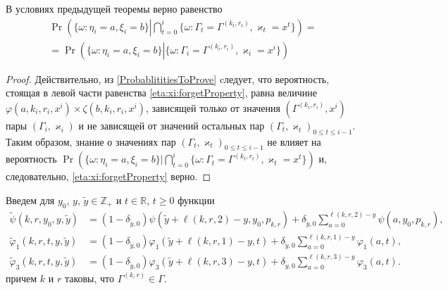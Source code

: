 \documentclass[a4paper,12pt,russian]{extarticle}
\newcommand{\ml}[1]{\begin{multline}#1\end{multline}}
\begin{document}
\begin{corollary}
В условиях предыдущей теоремы верно равенство
\ml
{
\Pr \left(\{ \omega \colon \eta_i = a, \xi_i=b\} \left|\bigcap_{t=0}^{i}\{\omega\colon \Gamma_t=\Gamma^{(k_t,r_t)}, \varkappa_t=x^t\}\right.\right)=\\
=\Pr \left(\{ \omega \colon \eta_i = a, \xi_i=b\} \left|\{\omega\colon \Gamma_i=\Gamma^{(k_i,r_i)}, \varkappa_i=x^i\}\right.\right)
\label{eta:xi:forgetProperty}
}
\label{eta:xi:forget}
\end{corollary}
\begin{proof}
Действительно, из \eqref{ProbablititiesToProve} cледует, что вероятность, стоящая в левой части равенства \eqref{eta:xi:forgetProperty}, равна величине $\varphi(a,k_i,r_i,x^i)\times \zeta(b,k_i,r_i,x^i)$, зависящей только от значения $(\Gamma^{(k_i,r_i)},x^i)$ пары $(\Gamma_i,\varkappa_i)$ и не зависящей от значений остальных пар $(\Gamma_t,\varkappa_t)_{0\leqslant t \leqslant i-1}$. Таким образом, знание о значениях пар $(\Gamma_t,\varkappa_t)_{0\leqslant t \leqslant i-1}$ не влияет на вероятность $\Pr (\{ \omega \colon \eta_i = a, \xi_i=b\} |\bigcap_{t=0}^{i}\{\omega\colon \Gamma_t=\Gamma^{(k_t,r_t)}, \varkappa_t=x^t\})$ и, следовательно, \eqref{eta:xi:forgetProperty} верно.
\end{proof}

Введем для $y_0$, $y$, $\tilde{y} \in \mathbb{Z}_+$ и $t \in \mathbb{R}$, $t\geqslant 0$ функции
\begin{equation}
\begin{aligned}
\widetilde{\psi}(k,r,y_0,y,\tilde{y}) &= 
(1 - \delta_{\tilde{y},0}) \psi(\tilde{y}+\ell(k,r,2)-y,y_0, p_{k,r}) + \delta_{\tilde{y},0}\sum_{a=0}^{\ell(k,r,2)-y} \psi(a,y_0, p_{k,r}),\\
\widetilde{\varphi}_1(k,r,t,y,\tilde{y}) &= (1-\delta_{\tilde{y},0}) \varphi_1(\tilde{y} + \ell(k,r,1)-y,t)  +\delta_{\tilde{y},0}\sum_{a=0}^{\ell(k,r,1)-y} \varphi_1(a,t),\\
\widetilde{\varphi}_3(k,r,t,y,\tilde{y}) &= (1-\delta_{\tilde{y},0}) \varphi_3(\tilde{y} + \ell(k,r,3)-y,t)  +\delta_{\tilde{y},0}\sum_{a=0}^{\ell(k,r,3)-y} \varphi_3(a,t).
\end{aligned}
\label{tildephi}
\end{equation}
причем $k$ и $r$ таковы, что $\Gamma^{(k,r)}\in \Gamma$.
	
\end{document}
